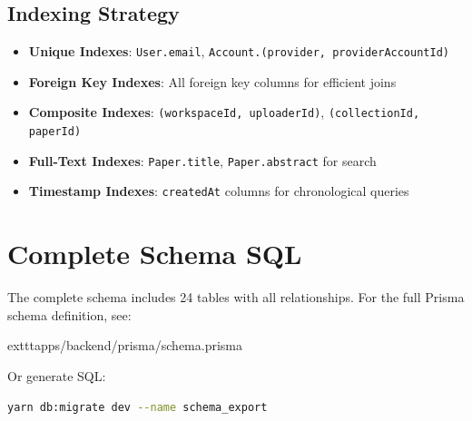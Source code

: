 \subsection{Indexing Strategy}
\begin{itemize}[leftmargin=*,topsep=3pt,itemsep=2pt]
    \item \textbf{Unique Indexes}: \texttt{User.email}, \texttt{Account.(provider, providerAccountId)}
    \item \textbf{Foreign Key Indexes}: All foreign key columns for efficient joins
    \item \textbf{Composite Indexes}: \texttt{(workspaceId, uploaderId)}, \texttt{(collectionId, paperId)}
    \item \textbf{Full-Text Indexes}: \texttt{Paper.title}, \texttt{Paper.abstract} for search
    \item \textbf{Timestamp Indexes}: \texttt{createdAt} columns for chronological queries
\end{itemize}

\section{Complete Schema SQL}
\label{sec:schema-complete-sql}

\begin{infobox}
The complete schema includes 24 tables with all relationships. For the full Prisma schema definition, see:

	exttt{apps/backend/prisma/schema.prisma}

Or generate SQL:
\begin{lstlisting}[language=bash]
yarn db:migrate dev --name schema_export
\end{lstlisting}
\end{infobox}
